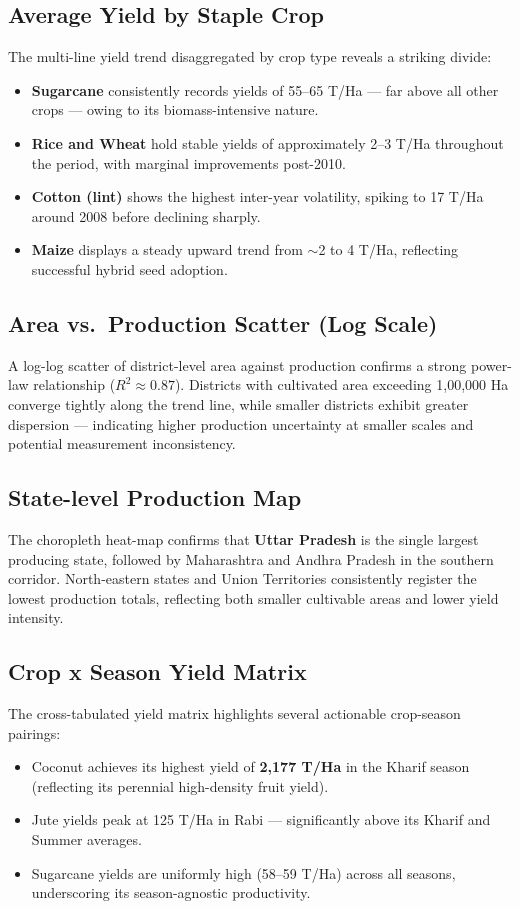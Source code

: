\documentclass[10pt]{article}
\begin{document}
\subsection{Average Yield by Staple Crop}
The multi-line yield trend disaggregated by crop type reveals a striking divide:
\begin{itemize}[leftmargin=*, topsep=2pt, itemsep=1pt]
  \item \textbf{Sugarcane} consistently records yields of 55–65 T/Ha — far above
        all other crops — owing to its biomass-intensive nature.
  \item \textbf{Rice and Wheat} hold stable yields of approximately 2–3 T/Ha
        throughout the period, with marginal improvements post-2010.
  \item \textbf{Cotton (lint)} shows the highest inter-year volatility, spiking
        to 17 T/Ha around 2008 before declining sharply.
  \item \textbf{Maize} displays a steady upward trend from $\sim$2 to 4 T/Ha,
        reflecting successful hybrid seed adoption.
\end{itemize}

\subsection{Area vs.\ Production Scatter (Log Scale)}
A log-log scatter of district-level area against production confirms a strong
power-law relationship ($R^2 \approx 0.87$). Districts with cultivated area
exceeding 1,00,000 Ha converge tightly along the trend line, while smaller
districts exhibit greater dispersion — indicating higher production uncertainty
at smaller scales and potential measurement inconsistency.

\subsection{State-level Production Map}
The choropleth heat-map confirms that \textbf{Uttar Pradesh} is the single
largest producing state, followed by Maharashtra and Andhra Pradesh in the
southern corridor. North-eastern states and Union Territories consistently
register the lowest production totals, reflecting both smaller cultivable areas
and lower yield intensity.

\subsection{Crop x Season Yield Matrix}
The cross-tabulated yield matrix highlights several actionable crop-season
pairings:
\begin{itemize}[leftmargin=*, topsep=2pt, itemsep=1pt]
  \item Coconut achieves its highest yield of \textbf{2,177 T/Ha} in the Kharif
        season (reflecting its perennial high-density fruit yield).
  \item Jute yields peak at 125 T/Ha in Rabi — significantly above its Kharif
        and Summer averages.
  \item Sugarcane yields are uniformly high (58–59 T/Ha) across all seasons,
        underscoring its season-agnostic productivity.
\end{itemize}
\end{document}
